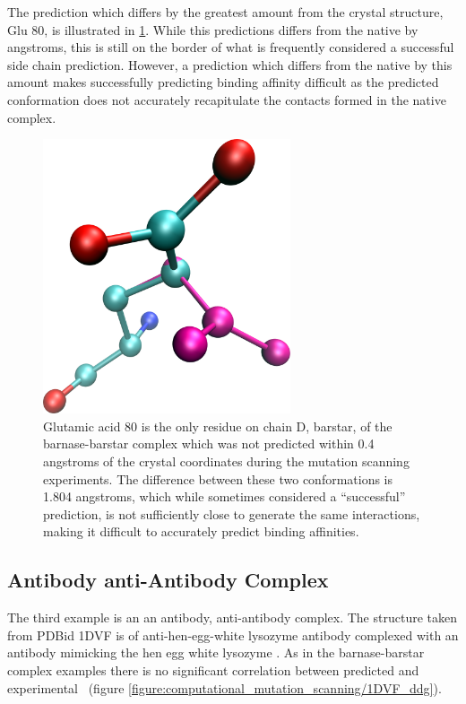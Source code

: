 The prediction which differs by the greatest amount from the crystal structure, Glu 80, is illustrated in \ref{figure:computational_mutation_scanning/1brs_d_80}.
While this predictions differs from the native by  angstroms, this is still on the border of what is frequently considered a successful side chain prediction.
However, a prediction which differs from the native by this amount makes successfully predicting binding affinity difficult as the predicted conformation does not accurately recapitulate the contacts formed in the native complex.
\begin{figure}[h]
    \centering
    \includegraphics[width=0.65\textwidth,height=0.3\textheight,keepaspectratio]{figures/mutation_side_chain_images/1brs_chain_d_80.png}
    \caption{Glutamic acid 80 is the only residue on chain D, barstar, of the barnase-barstar complex which was not predicted within 0.4 angstroms of the crystal coordinates during the mutation scanning experiments.
    The difference between these two conformations is 1.804 angstroms, which while sometimes considered a ``successful'' prediction, is not sufficiently close to generate the same interactions, making it difficult to accurately predict binding affinities.}
    \label{figure:computational_mutation_scanning/1brs_d_80}
\end{figure}

\FloatBarrier
\subsection{Antibody anti-Antibody Complex}
The third example is an an antibody, anti-antibody complex.
The structure taken from PDBid 1DVF is of anti-hen-egg-white lysozyme antibody complexed with an antibody mimicking the hen egg white lysozyme \cite{braden1996crystal}.
As in the barnase-barstar complex examples there is no significant correlation between predicted and experimental \ddg\ (figure \ref{figure:computational_mutation_scanning/1DVF_ddg}).


